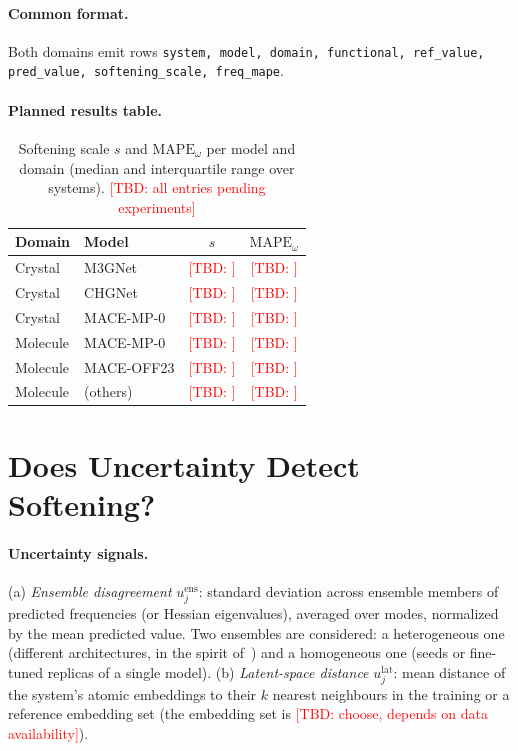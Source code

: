 \documentclass{article}
\newcommand{\TBD}[1]{\textcolor{red}{[TBD: #1]}}
\newcommand{\sfs}{s}      %
\begin{document}
\paragraph{Common format.} Both domains emit rows \texttt{system, model, domain, functional, ref\_value, pred\_value, softening\_scale, freq\_mape}.

\paragraph{Planned results table.}
\begin{table}[h]
\centering
\caption{Softening scale $\sfs$ and $\mathrm{MAPE}_\omega$ per model and domain (median and interquartile range over systems). \TBD{all entries pending experiments}}
\begin{tabular}{llcc}
\toprule
Domain & Model & $\sfs$ & $\mathrm{MAPE}_\omega$\\
\midrule
Crystal & M3GNet & \TBD{} & \TBD{}\\
Crystal & CHGNet & \TBD{} & \TBD{}\\
Crystal & MACE-MP-0 & \TBD{} & \TBD{}\\
Molecule & MACE-MP-0 & \TBD{} & \TBD{}\\
Molecule & MACE-OFF23 & \TBD{} & \TBD{}\\
Molecule & (others) & \TBD{} & \TBD{}\\
\bottomrule
\end{tabular}
\end{table}

\section{Does Uncertainty Detect Softening?}\label{sec:uq}
\paragraph{Uncertainty signals.} (a) \emph{Ensemble disagreement} $u^{\mathrm{ens}}_j$: standard deviation across ensemble members of predicted frequencies (or Hessian eigenvalues), averaged over modes, normalized by the mean predicted value. Two ensembles are considered: a heterogeneous one (different architectures, in the spirit of~\cite{hetero2025}) and a homogeneous one (seeds or fine-tuned replicas of a single model). (b) \emph{Latent-space distance} $u^{\mathrm{lat}}_j$: mean distance of the system's atomic embeddings to their $k$ nearest neighbours in the training or a reference embedding set (the embedding set is \TBD{choose, depends on data availability}).
\end{document}
